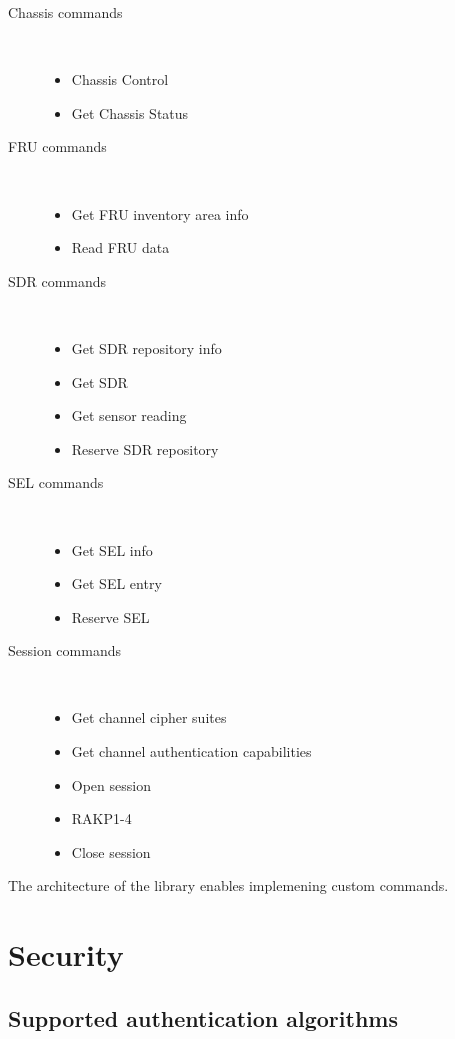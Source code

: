 \documentclass{article}
\begin{document}
\begin{description}
  \item[Chassis commands] ~
  \begin{itemize}
    \item Chassis Control
	\item Get Chassis Status    
  \end{itemize}
  \item[FRU commands] ~
  \begin{itemize}
    \item Get FRU inventory area info
	\item Read FRU data    
  \end{itemize}
  \item[SDR commands] ~
  \begin{itemize}
    \item Get SDR repository info
	\item Get SDR
	\item Get sensor reading
	\item Reserve SDR repository    
  \end{itemize}
  \item[SEL commands] ~
  \begin{itemize}
    \item Get SEL info
	\item Get SEL entry
	\item Reserve SEL    
  \end{itemize}
  \item[Session commands] ~
  \begin{itemize}
    \item Get channel cipher suites
	\item Get channel authentication capabilities
	\item Open session
	\item RAKP1-4
	\item Close session    
  \end{itemize}
\end{description}

The architecture of the library enables implemening custom commands.

\section{Security}

\subsection{Supported authentication algorithms}
\end{document}
